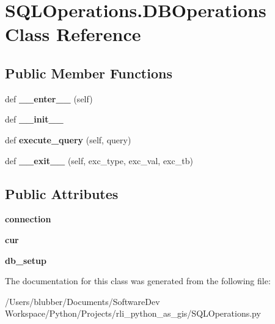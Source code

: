 \hypertarget{class_s_q_l_operations_1_1_d_b_operations}{}\section{S\+Q\+L\+Operations.\+D\+B\+Operations Class Reference}
\label{class_s_q_l_operations_1_1_d_b_operations}
\subsection*{Public Member Functions}
\begin{DoxyCompactItemize}
\item 
\hypertarget{class_s_q_l_operations_1_1_d_b_operations_a3f0d8876701395a42ff45f7b79c75d74}{}def {\bfseries \+\_\+\+\_\+enter\+\_\+\+\_\+} (self)\label{class_s_q_l_operations_1_1_d_b_operations_a3f0d8876701395a42ff45f7b79c75d74}

\item 
\hypertarget{class_s_q_l_operations_1_1_d_b_operations_a6740565be31768854cf36a3811e788a3}{}def {\bfseries \+\_\+\+\_\+init\+\_\+\+\_\+}\label{class_s_q_l_operations_1_1_d_b_operations_a6740565be31768854cf36a3811e788a3}

\item 
\hypertarget{class_s_q_l_operations_1_1_d_b_operations_a5a75d33811f72f5ab56ebb53b7744fa3}{}def {\bfseries execute\+\_\+query} (self, query)\label{class_s_q_l_operations_1_1_d_b_operations_a5a75d33811f72f5ab56ebb53b7744fa3}

\item 
\hypertarget{class_s_q_l_operations_1_1_d_b_operations_afe57de4264a7f52b4127308642aa4afd}{}def {\bfseries \+\_\+\+\_\+exit\+\_\+\+\_\+} (self, exc\+\_\+type, exc\+\_\+val, exc\+\_\+tb)\label{class_s_q_l_operations_1_1_d_b_operations_afe57de4264a7f52b4127308642aa4afd}

\end{DoxyCompactItemize}
\subsection*{Public Attributes}
\begin{DoxyCompactItemize}
\item 
\hypertarget{class_s_q_l_operations_1_1_d_b_operations_ab5d8122feb38fd555eb06c938b6a83db}{}{\bfseries connection}\label{class_s_q_l_operations_1_1_d_b_operations_ab5d8122feb38fd555eb06c938b6a83db}

\item 
\hypertarget{class_s_q_l_operations_1_1_d_b_operations_a93a542318dcdc666cae23196662a7e17}{}{\bfseries cur}\label{class_s_q_l_operations_1_1_d_b_operations_a93a542318dcdc666cae23196662a7e17}

\item 
\hypertarget{class_s_q_l_operations_1_1_d_b_operations_aa726a4bbd72110c98c27aa32f4c69c52}{}{\bfseries db\+\_\+setup}\label{class_s_q_l_operations_1_1_d_b_operations_aa726a4bbd72110c98c27aa32f4c69c52}

\end{DoxyCompactItemize}


The documentation for this class was generated from the following file\+:\begin{DoxyCompactItemize}
\item 
/\+Users/blubber/\+Documents/\+Software\+Dev Workspace/\+Python/\+Projects/rli\+\_\+python\+\_\+as\+\_\+gis/S\+Q\+L\+Operations.\+py\end{DoxyCompactItemize}
